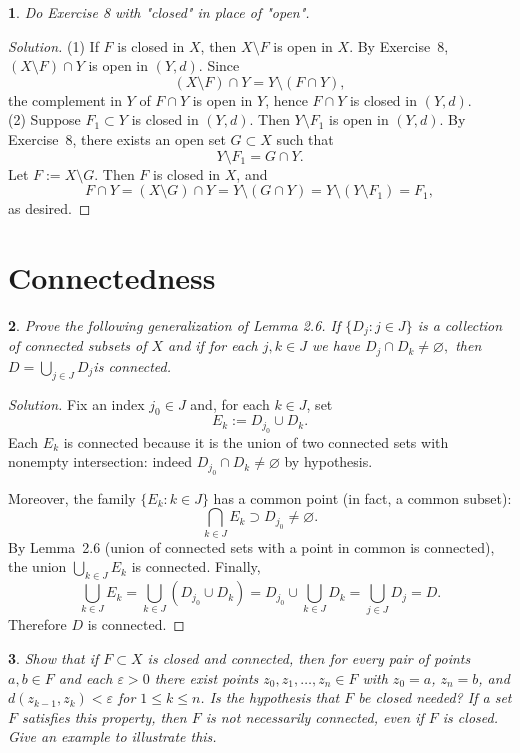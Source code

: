 \documentclass[12pt, a4paper]{report}
\theoremstyle{spaced}
\newtheorem{exercise}{}
\newcommand{\setexercise}[1]{\setcounter{exercise}{#1-1}}
\begin{document}
\setexercise{9}
\begin{exercise}
	Do Exercise 8 with "closed" in place of "open".
\end{exercise}
\begin{proof}[Solution]
	(1) If $F$ is closed in $X$, then $X\setminus F$ is open in $X$. By Exercise~8,
	$(X\setminus F)\cap Y$ is open in $(Y,d)$. Since
	\[
		(X\setminus F)\cap Y=Y\setminus(F\cap Y),
	\]
	the complement in $Y$ of $F\cap Y$ is open in $Y$, hence $F\cap Y$ is closed in $(Y,d)$.\\

	(2) Suppose $F_1\subset Y$ is closed in $(Y,d)$. Then $Y\setminus F_1$ is open in $(Y,d)$.
	By Exercise~8, there exists an open set $G\subset X$ such that
	\[
		Y\setminus F_1=G\cap Y.
	\]
	Let $F:=X\setminus G$. Then $F$ is closed in $X$, and
	\[
		F\cap Y=(X\setminus G)\cap Y
		=Y\setminus(G\cap Y)
		=Y\setminus(Y\setminus F_1)
		=F_1,
	\]
	as desired.
\end{proof}

\section{Connectedness}
\setexercise{4}
\begin{exercise}
	Prove the following generalization of Lemma 2.6.
	If $\{D_j : j \in J\}$ is a collection of connected subsets of $X$ and if for each $j,k \in J$ we have \(D_j \cap D_k \neq \varnothing,\)
	then \(D = \bigcup_{j \in J} D_j\)is connected.
\end{exercise}
\begin{proof}[Solution]
	Fix an index $j_0 \in J$ and, for each $k \in J$, set
	\[
		E_k := D_{j_0} \cup D_k.
	\]
	Each $E_k$ is connected because it is the union of two connected sets with nonempty
	intersection:
	indeed $D_{j_0} \cap D_k \neq \varnothing$ by hypothesis.

	Moreover, the family $\{E_k : k \in J\}$ has a common point (in fact, a common subset):
	\[
		\bigcap_{k \in J} E_k \supset D_{j_0} \neq \varnothing.
	\]
	By Lemma~2.6 (union of connected sets with a point in common is connected),
	the union $\bigcup_{k \in J} E_k$ is connected. Finally,
	\[
		\bigcup_{k \in J} E_k
		= \bigcup_{k \in J} (D_{j_0} \cup D_k)
		= D_{j_0} \cup \bigcup_{k \in J} D_k
		= \bigcup_{j \in J} D_j
		= D.
	\]
	Therefore $D$ is connected.
\end{proof}

\setexercise{5}
\begin{exercise}
	Show that if \(F \subset X\) is closed and connected, then for every pair of points
	\(a,b \in F\) and each \(\varepsilon>0\) there exist points
	\(z_0,z_1,\ldots,z_n \in F\) with \(z_0=a\), \(z_n=b\), and
	\(d(z_{k-1},z_k) < \varepsilon\) for \(1 \le k \le n\).
	Is the hypothesis that \(F\) be closed needed?
	If a set \(F\) satisfies this property, then \(F\) is not necessarily connected,
	even if \(F\) is closed. Give an example to illustrate this.
\end{exercise}
\end{document}
